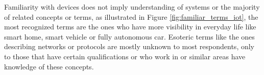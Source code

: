 

Familiarity with \hyperlink{\acronym}{\acronym} devices does not imply understanding of \hyperlink{\acronym}{\acronym} systems
or the majority of \hyperlink{\acronym}{\acronym} related concepts or terms,
as illustrated in Figure \ref{fig:familiar_terms_iot},
the most recognized terms are the ones who have more visibility
in everyday life like smart home, smart vehicle or fully autonomous car.
Esoteric terms like the ones describing networks or protocols are mostly
unknown to most respondents, only to those that have certain
qualifications or who work in \hyperlink{\acronym}{\acronym} or similar areas have knowledge of these concepts.

